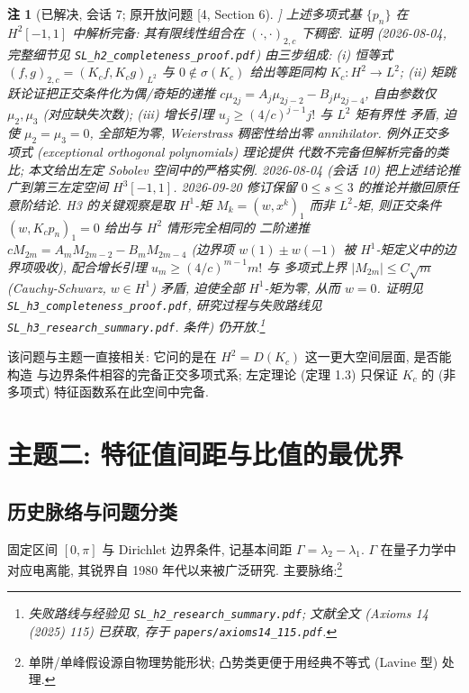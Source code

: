 \documentclass[UTF8]{ctexart}
\newtheorem{remark}[theorem]{注}
\begin{document}
\begin{remark}[已解决, 会话 7; 原开放问题 [4, Section 6]]
上述多项式基 $\{p_n\}$ 在 $H^2[-1,1]$ 中\emph{解析完备}: 其有限线性组合在
$(\cdot, \cdot)_{2,c}$ 下稠密. 证明 (2026-08-04, 完整细节见
\texttt{SL\_h2\_completeness\_proof.pdf}) 由三步组成: (i) 恒等式
$(f,g)_{2,c} = (K_c f, K_c g)_{L^2}$ 与 $0 \notin \sigma(K_c)$ 给出等距同构
$K_c: H^2 \to L^2$; (ii) 矩跳跃论证把正交条件化为偶/奇矩的递推
$c\mu_{2j} = A_j\mu_{2j-2} - B_j\mu_{2j-4}$, 自由参数仅 $\mu_2, \mu_3$
(对应缺失次数); (iii) 增长引理 $u_j \geq (4/c)^{j-1}j!$ 与 $L^2$ 矩有界性
矛盾, 迫使 $\mu_2 = \mu_3 = 0$, 全部矩为零, Weierstrass 稠密性给出零
annihilator. 例外正交多项式 (exceptional orthogonal polynomials) 理论提供
代数不完备但解析完备的类比; 本文给出左定 Sobolev 空间中的严格实例.
2026-08-04 (会话 10) 把上述结论推广到第三左定空间 $H^3[-1,1]$.
2026-09-20 修订保留 $0\le s\le3$ 的推论并撤回原任意阶结论.
H3 的关键观察是取 $H^1$-矩 $M_k = (w, x^k)_1$ 而非
$L^2$-矩, 则正交条件 $(w, K_c p_n)_1 = 0$ 给出与 $H^2$ 情形\emph{完全相同}的
二阶递推 $cM_{2m} = A_m M_{2m-2} - B_m M_{2m-4}$ (边界项 $w(1)\pm w(-1)$
被 $H^1$-矩定义中的边界项吸收), 配合增长引理 $u_m \geq (4/c)^{m-1}m!$ 与
多项式上界 $|M_{2m}| \leq C\sqrt m$ (Cauchy-Schwarz, $w \in H^1$) 矛盾,
迫使全部 $H^1$-矩为零, 从而 $w = 0$. 证明见
\texttt{SL\_h3\_completeness\_proof.pdf}, 研究过程与失败路线见
\texttt{SL\_h3\_research\_summary.pdf}.
条件) 仍开放.\footnote{失败路线与经验见 \texttt{SL\_h2\_research\_summary.pdf}; 文献全文 (Axioms 14 (2025) 115) 已获取, 存于 \texttt{papers/axioms14\_115.pdf}.}
\end{remark}

该问题与主题一直接相关: 它问的是在 $H^2 = D(K_c)$ 这一更大空间层面, 是否能构造
与边界条件相容的完备正交多项式系; 左定理论 (定理 1.3) 只保证 $K_c$ 的 (非多项式)
特征函数系在此空间中完备.

\section{主题二: 特征值间距与比值的最优界}

\subsection{历史脉络与问题分类}

固定区间 $[0, \pi]$ 与 Dirichlet 边界条件, 记基本间距 $\Gamma = \lambda_2 - \lambda_1$.
$\Gamma$ 在量子力学中对应电离能, 其锐界自 1980 年代以来被广泛研究. 主要脉络:\footnote{单阱/单峰假设源自物理势能形状; 凸势类更便于用经典不等式 (Lavine 型) 处理.}
\end{document}
